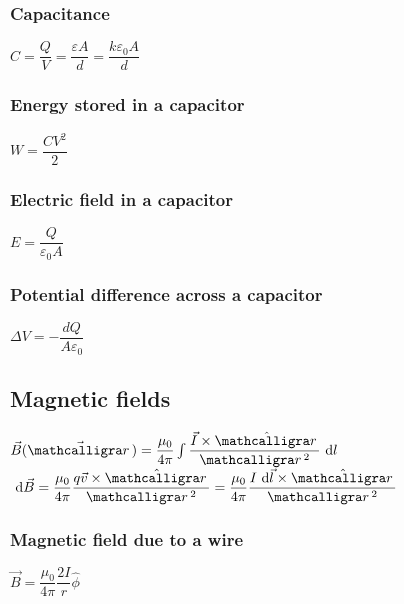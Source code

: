 \subsubsection{Capacitance}
\begin{itemize}
\itemt \( C = \dfrac{Q}{V} = \dfrac{\varepsilon A}{d} = \dfrac{k\varepsilon_0A}{d} \)
\end{itemize}

\subsubsection{Energy stored in a capacitor}
\begin{itemize}
\itemt \( W = \dfrac{CV^2}{2} \)
\end{itemize}

\subsubsection{Electric field in a capacitor}
\begin{itemize}
\itemt \( E = \dfrac{Q}{\varepsilon_0 A} \)
\end{itemize}

\subsubsection{Potential difference across a capacitor}
\begin{itemize}
\itemt \( \Delta V = -\dfrac{dQ}{A\varepsilon_0} \)
\end{itemize}
				
		\subsection{Magnetic fields}
        
\begin{itemize}
\itemt \( \vec{B}(\vec{\scriptr}) = \dfrac{\mu_0}{4\pi} \int \dfrac{\vec{I}\times\hat{\scriptr}}{\scriptr^2} \dn l \)
\itemt \( \dn \vec{B} = \dfrac{\mu_0}{4\pi} \dfrac{q\vec{v}\times\hat{\scriptr}}{\scriptr^2} = \dfrac{\mu_0}{4\pi} \dfrac{I\dn\vec{l}\times\hat{\scriptr}}{\scriptr^2} \)
\end{itemize}

\subsubsection{Magnetic field due to a wire}
\begin{itemize}
\itemt \( \vec{B} = \dfrac{\mu_0}{4\pi} \dfrac{2I}{r} \hat{\phi} \)
\end{itemize}

